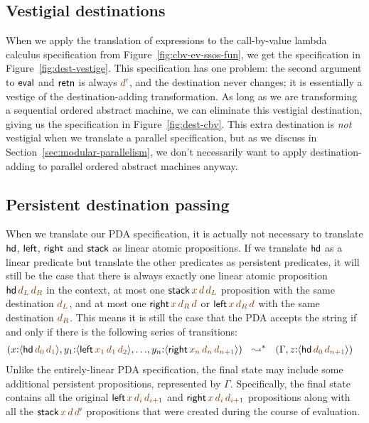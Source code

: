 \subsection{Vestigial destinations}
\label{sec:vestigial}

When we apply the translation of expressions to the call-by-value
lambda calculus specification from Figure~\ref{fig:cbv-ev-ssos-fun},
we get the specification in Figure~\ref{fig:dest-vestige}.  This
specification has one problem: the second argument to ${\sf eval}$ and
${\sf retn}$ is always $\lf{d'}$, and the destination never changes; it is
essentially a vestige of the destination-adding transformation. As
long as we are transforming a sequential ordered abstract machine, we
can eliminate this vestigial destination, giving us the specification
in Figure~\ref{fig:dest-cbv}. This extra destination is {\it not}
vestigial when we translate a parallel specification, but as we
discuss in Section~\ref{sec:modular-parallelism}, we don't necessarily
want to apply destination-adding to parallel ordered abstract machines
anyway.

\subsection{Persistent destination passing}
\label{sec:persistentdestpass}

When we translate our PDA specification, it is actually not necessary
to translate ${\sf hd}$, ${\sf left}$, ${\sf right}$ and ${\sf stack}$ as
linear atomic propositions. If we translate ${\sf hd}$ as
a linear predicate but translate the other predicates as persistent
predicates, it will still be the case that there is always exactly one
linear atomic proposition ${\sf hd}\,\lf{d_L}\,\lf{d_R}$ 
in the context, at most one
${\sf stack}\,\lf{x}\,\lf{d}\,\lf{d_L}$ 
proposition with the same destination $\lf{d_L}$, 
and at most one ${\sf right}\,\lf{x}\,\lf{d_R}\,\lf{d}$ or 
${\sf left}\,\lf{x}\,\lf{d_R}\,\lf{d}$ 
with the same destination $\lf{d_R}$. This means it is still the case that the
PDA accepts the string if and only if there is the following series of 
transitions:
\begin{align*}
(    x{:}\susp{{\sf hd}\,\lf{d_0}\,\lf{d_1}}, 
    y_1{:}\susp{{\sf left}\,\lf{x_1}\,\lf{d_1}\,\lf{d_2}},
    \ldots&,
    y_n{:}\susp{{\sf right}\,\lf{x_n}\,\lf{d_n}\,\lf{d_{n+1}}})%
~~ \leadsto^* ~~
(\Gamma, z{:}\susp{{\sf hd}\,\lf{d_0}\,\lf{d_{n+1}}})%
\end{align*}
Unlike the entirely-linear PDA specification, the final state may include
some additional 
persistent propositions, represented by $\Gamma$. Specifically, the final state
contains all the original ${\sf left}\,\lf{x}\,\lf{d_i}\,\lf{d_{i+1}}$ and
${\sf right}\,\lf{x}\,\lf{d_i}\,\lf{d_{i+1}}$ propositions 
along with all the ${\sf stack}\,\lf{x}\,\lf{d}\,\lf{d'}$ 
propositions that were created
during the course of evaluation.

